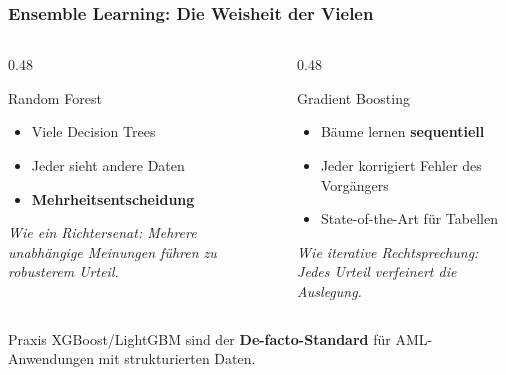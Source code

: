 \documentclass[11pt, aspectratio=169]{beamer}
\begin{document}
\begin{frame}
    \frametitle{Ensemble Learning: Die Weisheit der Vielen}
    \begin{columns}[t]
        \begin{column}{0.48\textwidth}
            \begin{block}{Random Forest}
                \begin{itemize}
                    \item Viele Decision Trees
                    \item Jeder sieht andere Daten
                    \item \textbf{Mehrheitsentscheidung}
                \end{itemize}
                \vspace{0.2cm}
                \textit{Wie ein Richtersenat: Mehrere unabhängige Meinungen führen zu robusterem Urteil.}
            \end{block}
        \end{column}
        \begin{column}{0.48\textwidth}
            \begin{block}{Gradient Boosting}
                \begin{itemize}
                    \item Bäume lernen \textbf{sequentiell}
                    \item Jeder korrigiert Fehler des Vorgängers
                    \item State-of-the-Art für Tabellen
                \end{itemize}
                \vspace{0.2cm}
                \textit{Wie iterative Rechtsprechung: Jedes Urteil verfeinert die Auslegung.}
            \end{block}
        \end{column}
    \end{columns}
    \vspace{0.3cm}
    \begin{alertblock}{Praxis}
        XGBoost/LightGBM sind der \textbf{De-facto-Standard} für AML-Anwendungen mit strukturierten Daten.
    \end{alertblock}
\end{frame}
\end{document}
